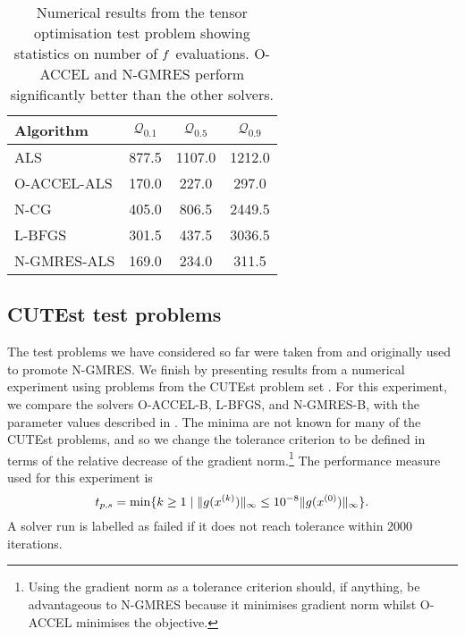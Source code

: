 \documentclass[main.tex]{subfiles}
\begin{document}
\begin{table}[hbtp]
  \centering
  \begin{tabular}{lS[table-auto-round,table-format=4]
    S[table-auto-round,table-format=4]
    S[table-auto-round,table-format=4]}
    \toprule
    Algorithm&{$\mathcal{Q}_{0.1}$}&{$\mathcal{Q}_{0.5}$}&{$\mathcal{Q}_{0.9}$}\\
    \midrule
    ALS&877.5&1107.0&1212.0\\
    O-ACCEL-ALS&170.0&227.0&297.0\\
    N-CG&405.0&806.5&2449.5\\
    L-BFGS&301.5&437.5&3036.5\\
    N-GMRES-ALS&169.0&234.0&311.5\\
    \bottomrule
  \end{tabular}
  \caption[Numerical results from the tensor optimisation test problem]{Numerical results from the tensor optimisation test
    problem showing statistics on number of $f$ evaluations. O-ACCEL and N-GMRES perform significantly better than the
    other solvers.}\label{tbl:quantiles_tensor_cp_all}
\end{table}


\subsection{CUTEst test problems}
The test problems we have considered so far were taken from
\citet{sterck2013steepest} and originally used to promote N-GMRES. We
finish by presenting results from a numerical experiment using
problems from the CUTEst problem set \citep{gould2015cutest}.  For this
experiment, we compare the solvers O-ACCEL-B, L-BFGS, and N-GMRES-B,
with the parameter values described in
.  The minima are not known for many of
the CUTEst problems, and so we change the tolerance criterion to be
defined in terms of the relative decrease of the gradient
norm.\footnote{Using the gradient norm as a tolerance criterion should, if anything, be
  advantageous to N-GMRES because it minimises gradient norm whilst
  O-ACCEL minimises the objective.}
The
performance measure used for this experiment is
\begin{equation}\label{eq:def_performance_measure_cutest}
  t_{p,s} = \min\{k\geq 1 \mid \|g(x^{(k)})\|_\infty \leq 10^{-8}\|g(x^{(0)})\|_\infty\}.
\end{equation}
A solver run is labelled as failed if it does not reach tolerance
within \num{2000} iterations.
\end{document}
